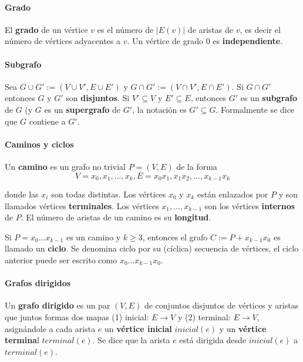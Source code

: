 \paragraph{Grado}
El \textbf{grado} de un vértice $v$ es el número de $|E(v)|$ de aristas de $v$, es decir el número de vértices adyacentes a $v$. Un vértice de grado 0 es \textbf{independiente}.

\paragraph{Subgrafo}
Sea $G\cup  G':=(V\cup  V', E\cup  E')$ y $G\cap  G':=(V\cap  V', E\cap  E')$. Si $G\cap G'$ entonces $G$ y $G'$ son \textbf{disjuntos}. Si  $V'\subseteq V$ y $E'\subseteq E$, entonces $G'$ es un \textbf{subgrafo} de $G$ (y $G$ es un \textbf{supergrafo} de $G'$, la notación es $G'\subseteq G$. Formalmente se dice que $G$ contiene a $G'$.

\paragraph{Caminos y ciclos}
Un \textbf{camino} es un grafo no trivial $P=(V,E)$ de la forma 
\begin{equation}
V={x_{0},x_{1},...,x_{k}}, E={x_{0}x_{1},x_{1}x_{2},...,x_{k-1}x_{k}}
\end{equation}

donde las $x_{i}$ son todas distintas. Los vértices $x_{0}$ y $x_{k}$ están enlazados por $P$ y son llamados vértices \textbf{terminales}. Los vértices $x_{1},...,x_{k-1}$ son los vértices \textbf{internos} de $P$. El número de aristas de un camino es su \textbf{longitud}.

Si $P=x_{0}...x_{k-1}$ es un camino y $k\geq 3$, entonces el grafo $C:=P+x_{k-1}x_{0}$ es llamado un \textbf{ciclo}. Se denomina ciclo por su (cíclica) secuencia de vértices, el ciclo anterior puede ser escrito como $x_{0}...x_{k-1}x_{0}$.

\paragraph{Grafos dirigidos}
Un \textbf{grafo dirigido} es un par $(V,E)$ de conjuntos disjuntos de vértices y aristas que juntos formas dos mapas (1) inicial: $E\rightarrow V$ y (2) terminal: $E\rightarrow V$, asignándole a cada arista $e$ un \textbf{vértice inicial} $inicial(e)$ y un \textbf{vértice termina}l $terminal(e)$. Se dice que la arista $e$ está dirigida desde $inicial(e)$ a $terminal(e)$.

